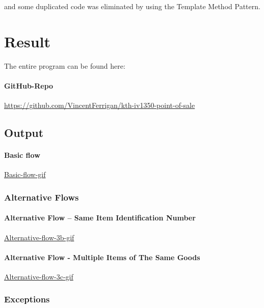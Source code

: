 \documentclass[a4paper]{scrreprt}
\begin{document}
and some duplicated code was eliminated by using the Template Method Pattern.



\newpage
\chapter{Result}
\label{sec:result}

The entire program can be found here:

\subsubsection*{GitHub-Repo}
\url{https://github.com/VincentFerrigan/kth-iv1350-point-of-sale}

\section*{Output}

\subsubsection*{Basic flow}
\href{https://github.com/VincentFerrigan/kth-iv1350-object-oriented-design/tree/main#basic-flow}{Basic-flow-gif}

\subsection*{Alternative Flows}
\subsubsection*{Alternative Flow -- Same Item Identification Number}
\href{https://github.com/VincentFerrigan/kth-iv1350-object-oriented-design#alternative-flow---same-item-identification-number}{Alternative-flow-3b-gif}

\subsubsection*{Alternative Flow - Multiple Items of The Same Goods}
\href{https://github.com/VincentFerrigan/kth-iv1350-object-oriented-design#alternative-flow---multiple-items-of-the-same-goods}{Alternative-flow-3c-gif}

\subsection*{Exceptions}
\end{document}
